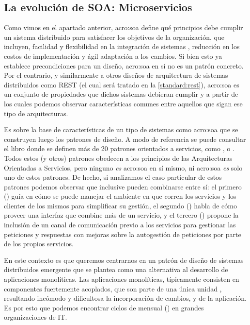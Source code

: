 \subsection{La evolución de SOA: Microservicios}
\label{microservicios}

Como vimos en el apartado anterior, \gls{acro:soa} define qué principios debe cumplir un sistema distribuido para satisfacer los objetivos de la organización, que incluyen, facilidad y flexibilidad en la integración de sistemas , reducción en los costos de implementación y ágil adaptación a los cambios. Si bien esto ya establece precondiciones para un diseño, \gls{acro:soa} en sí no es un patrón concreto. Por el contrario, y similarmente a otros diseños de arquitectura de sistemas distribuidos como REST (el cual será tratado en la \autoref{standard:rest}), \gls{acro:soa} es un conjunto de propiedades que dichos sistemas debieran cumplir y a partir de los cuales podemos observar características comunes entre aquellos que sigan ese tipo de arquitecturas.

Es sobre la base de características de un tipo de sistemas como \gls{acro:soa} que se construyen luego los patrones de diseño. A modo de referencia se puede consultar el libro  donde se definen más de 20 patrones orientados a servicios, como \cite[p.~19]{soapatterns}, \cite[p.~148]{soapatterns} o \cite[p.162]{soapatterns}. Todos estos (y otros) patrones obedecen a los principios de las Arquitecturas Orientadas a Servicios, pero ninguno \textit{es} \gls{acro:soa} en sí mismo, ni \gls{acro:soa} \textit{es} solo uno de estos patrones. De hecho, si analizamos el caso particular de estos patrones podemos observar que inclusive pueden combinarse entre sí: el primero () guía en cómo se puede manejar el ambiente en que corren los servicios y los clientes de los mismos para simplificar su gestión, el segundo () habla de cómo proveer una interfaz que combine más de un servicio, y el tercero () propone la inclusión de un canal de comunicación previo a los servicios para gestionar las peticiones y respuestas con mejoras sobre la autogestión de peticiones por parte de los propios servicios.

En este contexto es que queremos centrarnos en un patrón de diseño de sistemas distribuidos emergente que se plantea como una alternativa al desarrollo de aplicaciones monolíticas.
Las aplicaciones monolíticas, típicamente consisten en componentes fuertemente acoplados, que son parte de una única unidad , resultando incómodo y dificultosa la incorporación de cambios,  y  de la aplicación.  Es por esto que podemos encontrar ciclos de  mensual () en grandes organizaciones de IT.

